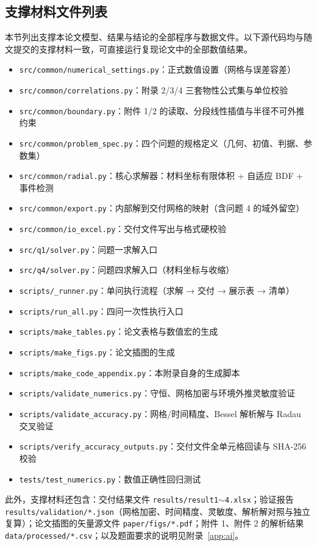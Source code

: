 \subsection*{支撑材料文件列表}
本节列出支撑本论文模型、结果与结论的全部程序与数据文件。以下源代码均与随文提交的支撑材料一致，可直接运行复现论文中的全部数值结果。
\begin{itemize}\itemsep1pt
  \item \texttt{src/common/numerical\_settings.py}：正式数值设置（网格与误差容差）
  \item \texttt{src/common/correlations.py}：附录 2/3/4 三套物性公式集与单位校验
  \item \texttt{src/common/boundary.py}：附件 1/2 的读取、分段线性插值与半径不可外推约束
  \item \texttt{src/common/problem\_spec.py}：四个问题的规格定义（几何、初值、判据、参数集）
  \item \texttt{src/common/radial.py}：核心求解器：材料坐标有限体积 + 自适应 BDF + 事件检测
  \item \texttt{src/common/export.py}：内部解到交付网格的映射（含问题 4 的域外留空）
  \item \texttt{src/common/io\_excel.py}：交付文件写出与格式硬校验
  \item \texttt{src/q1/solver.py}：问题一求解入口
  \item \texttt{src/q4/solver.py}：问题四求解入口（材料坐标与收缩）
  \item \texttt{scripts/\_runner.py}：单问执行流程（求解 → 交付 → 展示表 → 清单）
  \item \texttt{scripts/run\_all.py}：四问一次性执行入口
  \item \texttt{scripts/make\_tables.py}：论文表格与数值宏的生成
  \item \texttt{scripts/make\_figs.py}：论文插图的生成
  \item \texttt{scripts/make\_code\_appendix.py}：本附录自身的生成脚本
  \item \texttt{scripts/validate\_numerics.py}：守恒、网格加密与环境外推灵敏度验证
  \item \texttt{scripts/validate\_accuracy.py}：网格/时间精度、Bessel 解析解与 Radau 交叉验证
  \item \texttt{scripts/verify\_accuracy\_outputs.py}：交付文件全单元格回读与 SHA-256 校验
  \item \texttt{tests/test\_numerics.py}：数值正确性回归测试
\end{itemize}
此外，支撑材料还包含：交付结果文件 \texttt{results/result1$\sim$4.xlsx}；验证报告 \texttt{results/validation/*.json}（网格加密、时间精度、灵敏度、解析解对照与独立复算）；论文插图的矢量源文件 \texttt{paper/figs/*.pdf}；附件 1、附件 2 的解析结果 \texttt{data/processed/*.csv}；以及题面要求的说明见附录~\ref{app:ai}。
